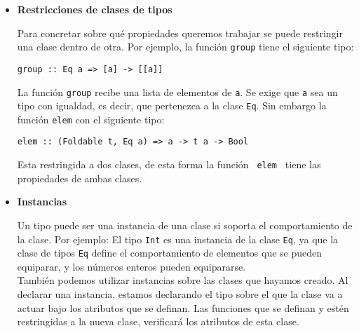 \begin{itemize}
\item \textbf{Restricciones de clases de tipos}

Para concretar sobre qué propiedades queremos trabajar se puede restringir una clase dentro de otra. Por ejemplo, la función \texttt{group} tiene el siguiente tipo:
\begin{center}
\texttt{group :: Eq a =>  [a] ->  [[a]]}
\end{center}
La función \texttt{group} recibe una lista de elementos de \texttt{a}. Se exige que \texttt{a} sea un tipo con igualdad, es decir, que pertenezca a la clase \texttt{Eq}. Sin embargo la función \texttt{elem} con el siguiente tipo:
\begin{center}
\texttt{elem :: (Foldable t, Eq a) =>  a ->  t a -> Bool}
\end{center}
Esta restringida a dos clases, de esta forma la función \texttt{ elem } tiene las propiedades de ambas clases.\\ 

\item \textbf{Instancias}

Un tipo puede ser una instancia de una clase si soporta el comportamiento de la clase. Por ejemplo:  El tipo \texttt{Int} es una instancia de la clase \texttt{Eq}, ya que la clase de tipos \texttt{Eq} define el comportamiento de elementos que se pueden equiparar, y los números enteros pueden equipararse.\\

También podemos utilizar instancias sobre las clases que hayamos creado. Al declarar una instancia, estamos declarando el tipo sobre el que la clase va a actuar bajo los atributos que se definan. Las funciones que se definan y estén restringidas a la nueva clase, verificará los atributos de esta clase.

\end{itemize}



